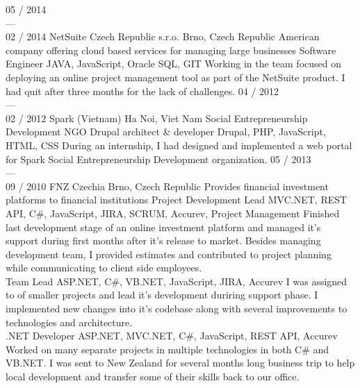 \documentclass[]{friggeri-cv} %
\begin{document}
\begin{entrylist}
  \job
  {05 / 2014 \\ --- \\ 02 / 2014}
  {NetSuite Czech Republic s.r.o.}
  {Brno, Czech Republic}
  {American company offering cloud based services for managing large businesses}
  {
    \position
    {Software Engineer}
    {JAVA, JavaScript, Oracle SQL, GIT}
    {Working in the team focused on deploying an online project management tool as part of the NetSuite product.
    I had quit after three months for the lack of challenges.}
  }
  \job
  {04 / 2012 \\ --- \\ 02 / 2012}
  {Spark (Vietnam)}
  {Ha Noi, Viet Nam}
  {Social Entrepreneurship Development NGO}
  {
    \position
    {Drupal architect \& developer}
    {Drupal, PHP, JavaScript, HTML, CSS}
    {During an internship, I had designed and implemented a web portal for Spark Social Entrepreneurship Development organization.}
  }
  \job
  {05 / 2013 \\ --- \\ 09 / 2010}
  {FNZ Czechia}
  {Brno, Czech Republic}
  {Provides financial investment platforms to financial institutions}
  {
    \position
    {Project Development Lead}
    {MVC.NET, REST API, C\#, JavaScript, JIRA, SCRUM, Accurev, Project Management}
    {Finished last development stage of an online investment platform and managed it's support during first months after it's
    release to market. Besides managing development team, I provided estimates and contributed to project planning
    while communicating to client side employees.}\\
    \position
    {Team Lead}
    {ASP.NET, C\#, VB.NET, JavaScript, JIRA, Accurev}
    {I was assigned to of smaller projects and lead it's development duriring support phase. I implemented new changes
    into it's codebase along with several improvements to technologies and architecture.}\\
    \position
    {.NET Developer}
    {ASP.NET, MVC.NET, C\#, JavaScript, REST API, Accurev}
    {Worked on many separate projects in multiple technologies in both C\# and VB.NET. I was sent to New Zealand for
    several months long business trip to help local development and transfer some of their skills back to our office.}%
  }
\end{entrylist}
\end{document}
